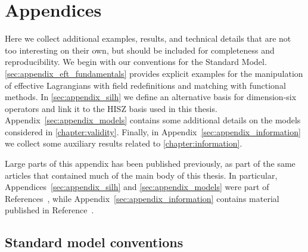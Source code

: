 



\chapter{Appendices}

Here we collect additional examples, results, and technical details
that are not too interesting on their own, but should be included for
completeness and reproducibility. We begin with our conventions for
the Standard Model. \autoref{sec:appendix_eft_fundamentals} provides
explicit examples for the manipulation of effective Lagrangians with
field redefinitions and matching with functional methods. In
\autoref{sec:appendix_silh} we define an alternative basis for
dimension-six operators and link it to the HISZ basis used in this
thesis. Appendix~\ref{sec:appendix_models} contains some additional
details on the models considered in
\autoref{chapter:validity}. Finally, in
Appendix~\ref{sec:appendix_information} we collect some auxiliary
results related to \autoref{chapter:information}.

Large parts of this appendix has been published previously, as part of
the same articles that contained much of the main body of this
thesis. In particular, Appendices~\ref{sec:appendix_silh} and
\ref{sec:appendix_models} were part of
References~\cite{Brehmer:2015rna, Biekotter:2016ecg}, while
Appendix~\ref{sec:appendix_information} contains material published in
Reference~\cite{Brehmer:2016nyr}.



\section{Standard model conventions}
\label{sec:appendix_sm}

